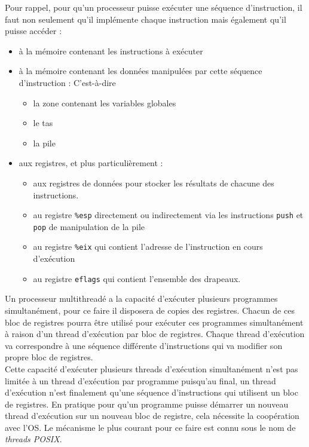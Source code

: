 Pour rappel, pour qu'un processeur puisse exécuter une séquence d'instruction,
il faut non seulement qu'il implémente chaque instruction
mais également qu'il puisse accéder :
\begin{itemize}
  \item à la mémoire contenant les instructions à exécuter
  \item à la mémoire contenant les données manipulées
    par cette séquence d'instruction : C'est-à-dire
    \begin{itemize}
      \item la zone contenant les variables globales
      \item le tas
      \item la pile
    \end{itemize}
  \item aux registres, et plus particulièrement :
    \begin{itemize}
      \item aux registres de données pour stocker les résultats de chacune des instructions.
      \item au registre \texttt{\%esp} directement ou indirectement via les instructions \texttt{push} et \texttt{pop} de manipulation de la pile
      \item au registre \texttt{\%eix} qui contient l'adresse de l'instruction en cours d'exécution
      \item au registre \texttt{eflags} qui contient l'ensemble des drapeaux.
    \end{itemize}
\end{itemize}

Un processeur multithreadé a la capacité d'exécuter plusieurs programmes simultanément, pour ce faire il disposera de copies des registres.
Chacun de ces bloc de registres pourra être utilisé pour exécuter ces programmes simultanément à raison d'un thread d'exécution par bloc de registres.
Chaque thread d'exécution va correspondre à une séquence différente d'instructions qui va modifier son propre bloc de registres.\\
Cette capacité d'exécuter plusieurs threads d'exécution simultanément n'est pas limitée à un thread d'exécution par programme puisqu'au final, un thread d'exécution n'est finalement qu'une séquence d'instructions qui utilisent un bloc de registres.
En pratique pour qu'un programme puisse démarrer un nouveau thread d'exécution sur un nouveau bloc de registre, cela nécessite la coopération avec l'OS.
Le mécanisme le plus courant pour ce faire est connu sous le nom de \emph{threads POSIX}.



